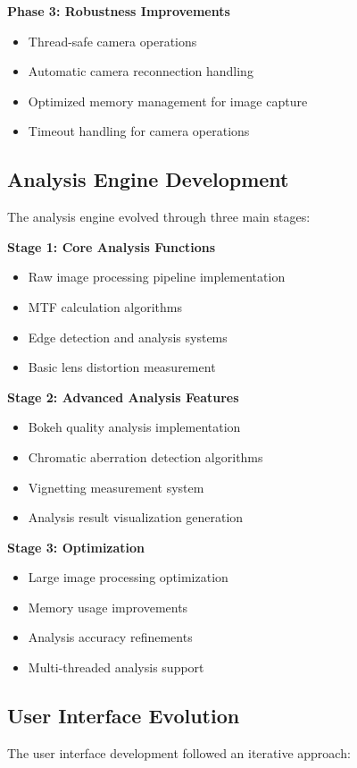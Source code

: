 \textbf{Phase 3: Robustness Improvements}
\begin{itemize}
    \item Thread-safe camera operations
    \item Automatic camera reconnection handling
    \item Optimized memory management for image capture
    \item Timeout handling for camera operations
\end{itemize}

\subsection{Analysis Engine Development}
The analysis engine evolved through three main stages:

\textbf{Stage 1: Core Analysis Functions}
\begin{itemize}
    \item Raw image processing pipeline implementation
    \item MTF calculation algorithms
    \item Edge detection and analysis systems
    \item Basic lens distortion measurement
\end{itemize}

\textbf{Stage 2: Advanced Analysis Features}
\begin{itemize}
    \item Bokeh quality analysis implementation
    \item Chromatic aberration detection algorithms
    \item Vignetting measurement system
    \item Analysis result visualization generation
\end{itemize}

\textbf{Stage 3: Optimization}
\begin{itemize}
    \item Large image processing optimization
    \item Memory usage improvements
    \item Analysis accuracy refinements
    \item Multi-threaded analysis support
\end{itemize}

\subsection{User Interface Evolution}
The user interface development followed an iterative approach:

